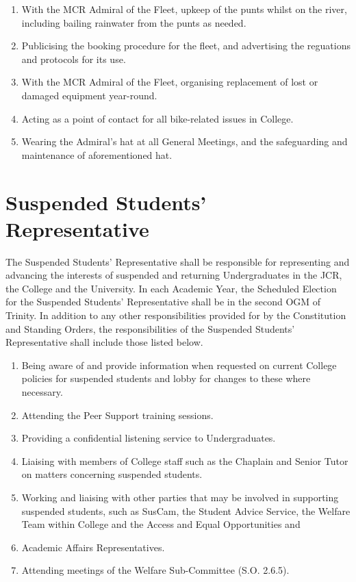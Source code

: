 \begin{enumerate}
	\item With the MCR Admiral of the Fleet, upkeep of the punts whilst on the river, including bailing rainwater from the punts as needed.
	\item Publicising the booking procedure for the fleet, and advertising the reguations and protocols for its use.
	\item With the MCR Admiral of the Fleet, organising replacement of lost or damaged equipment year-round.
	\item Acting as a point of contact for all bike-related issues in College.
	\item Wearing the Admiral's hat at all General Meetings, and the safeguarding and maintenance of aforementioned hat.
\end{enumerate}
\section{Suspended Students' Representative}
\npara The Suspended Students' Representative shall be responsible for representing  and advancing the interests of suspended and returning Undergraduates in the JCR, the College and the University.
\npara In each Academic Year, the Scheduled Election for the Suspended Students' Representative shall be in the second OGM of Trinity.
\npara In addition to any other responsibilities provided for by the Constitution and Standing Orders, the responsibilities of the Suspended Students' Representative shall include those listed below.
\begin{enumerate}
	\item Being aware of and provide information when requested on current College policies for suspended students and lobby for changes to these where necessary.
	\item Attending the Peer Support training sessions.
	\item Providing a confidential listening service to Undergraduates.
	\item Liaising with members of College staff such as the Chaplain and Senior Tutor on matters concerning suspended students.
	\item Working and liaising with other parties that may be involved in supporting suspended students, such as SusCam, the Student Advice Service, the Welfare Team within College and the Access and Equal Opportunities and \item Academic Affairs Representatives.
	\item Attending meetings of the Welfare Sub-Committee (S.O. 2.6.5).
\end{enumerate}
